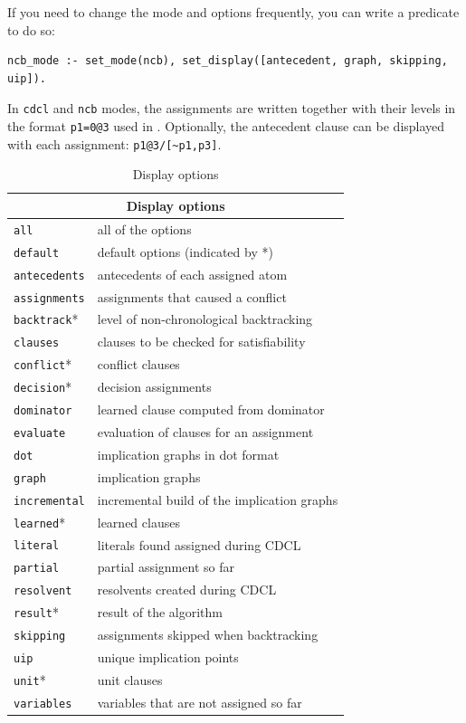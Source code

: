 \documentclass[11pt]{report}
\newcommand*{\p}[1]{\textup{\texttt{#1}}}
\begin{document}
If you need to change the mode and options frequently, you
can write a predicate to do so:
\begin{verbatim}
ncb_mode :- set_mode(ncb), set_display([antecedent, graph, skipping, uip]).
\end{verbatim}


In \p{cdcl} and \p{ncb} modes, the assignments are written together with
their levels in the format \p{p1=0@3} used in \cite{mlm}. Optionally,
the antecedent clause can be displayed with each assignment:
\verb+p1@3/[~p1,p3]+.

\begin{table}
\begin{center}
\begin{tabular}{|l|l|}
\hline
\multicolumn{2}{|c|}{\textbf{\large Display options}}\\
\hline
\p{all}       &  all of the options\\
\p{default}   &  default options (indicated by *)\\
\hline
\p{antecedents}&  antecedents of each assigned atom\\
\p{assignments}& assignments that caused a conflict         \\
\p{backtrack}*&  level of non-chronological backtracking    \\
\p{clauses}   &  clauses to be checked for satisfiability   \\
\p{conflict}* &  conflict clauses                           \\
\p{decision}* &  decision assignments                       \\
\p{dominator} &  learned clause computed from dominator     \\
\p{evaluate}  &  evaluation of clauses for an assignment    \\
\p{dot}       &  implication graphs in dot format           \\
\p{graph}     &  implication graphs                         \\
\p{incremental}& incremental build of the implication graphs\\
\p{learned}*  &  learned clauses                            \\
\p{literal}   &  literals found assigned during CDCL        \\
\p{partial}   &  partial assignment so far                  \\
\p{resolvent} &  resolvents created during CDCL             \\
\p{result}*   &  result of the algorithm                    \\
\p{skipping}  &  assignments skipped when backtracking      \\
\p{uip}       &  unique implication points                  \\
\p{unit}*     &  unit clauses                               \\
\p{variables} &  variables that are not assigned so far     \\
\hline
\end{tabular}
\end{center}
\caption{Display options}\label{tab.display}
\end{table}
\end{document}
